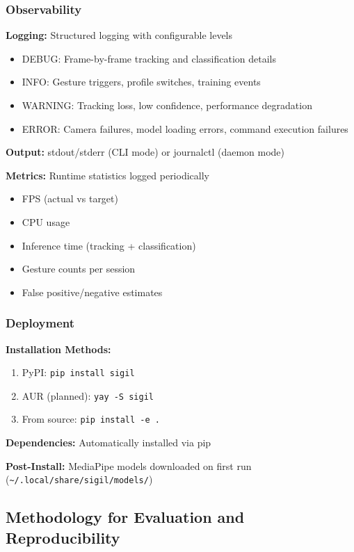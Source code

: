 \documentclass[11pt,a4paper]{article}
\begin{document}
\subsubsection{Observability}

\textbf{Logging:} Structured logging with configurable levels
\begin{itemize}
\item DEBUG: Frame-by-frame tracking and classification details
\item INFO: Gesture triggers, profile switches, training events
\item WARNING: Tracking loss, low confidence, performance degradation
\item ERROR: Camera failures, model loading errors, command execution failures
\end{itemize}

\textbf{Output:} stdout/stderr (CLI mode) or journalctl (daemon mode)

\textbf{Metrics:} Runtime statistics logged periodically
\begin{itemize}
\item FPS (actual vs target)
\item CPU usage
\item Inference time (tracking + classification)
\item Gesture counts per session
\item False positive/negative estimates
\end{itemize}

\subsubsection{Deployment}

\textbf{Installation Methods:}
\begin{enumerate}
\item PyPI: \texttt{pip install sigil}
\item AUR (planned): \texttt{yay -S sigil}
\item From source: \texttt{pip install -e .}
\end{enumerate}

\textbf{Dependencies:} Automatically installed via pip

\textbf{Post-Install:} MediaPipe models downloaded on first run (\texttt{\textasciitilde/.local/share/sigil/models/})

\subsection{Methodology for Evaluation and Reproducibility}
\end{document}

